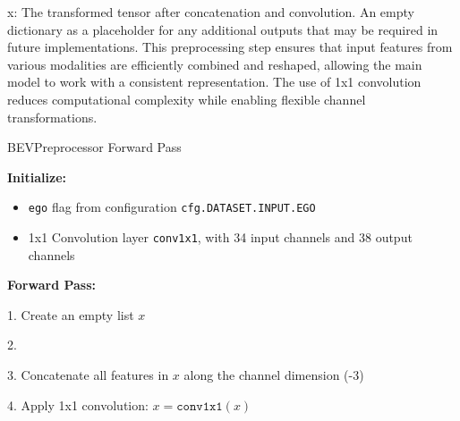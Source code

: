 x: The transformed tensor after concatenation and convolution.
An empty dictionary {} as a placeholder for any additional outputs that may be required in future implementations.
This preprocessing step ensures that input features from various modalities are efficiently combined and reshaped, allowing the main model to work with a consistent representation. The use of 1x1 convolution reduces computational complexity while enabling flexible channel transformations.

\begin{algorithm}[H]
\caption{BEVPreprocessor Forward Pass}


\BlankLine
\textbf{Initialize:} 
\begin{itemize}
  \item \texttt{ego} flag from configuration \texttt{cfg.DATASET.INPUT.EGO}
  \item 1x1 Convolution layer \texttt{conv1x1}, with 34 input channels and 38 output channels
\end{itemize}

\BlankLine
\textbf{Forward Pass:}

1. Create an empty list $x$

2. 

3. Concatenate all features in $x$ along the channel dimension (-3)

4. Apply 1x1 convolution: $x = \texttt{conv1x1}(x)$

\BlankLine
{}

\end{algorithm}


